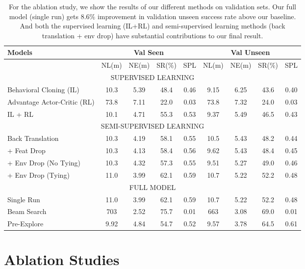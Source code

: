 \documentclass[11pt,a4paper]{article}
\begin{document}
\begin{table*}[t]
\small
\begin{center}

 \begin{tabular}{|l | c c c c | c c c c|}
  \hline
  Models & \multicolumn{4}{c|}{Val Seen} &  \multicolumn{4}{c|}{Val Unseen} \\
  \hline 
   & NL(m) & NE(m)  & SR(\%) & SPL &   NL(m) & NE(m)  & SR(\%) & SPL  \\
\hline\hline
\multicolumn{9}{|c|}{SUPERVISED LEARNING}\\
\hline\hline
Behavioral Cloning (IL) & 10.3&	5.39&	48.4&	0.46&	9.15&	6.25&	43.6&	0.40\\
Advantage Actor-Critic (RL) & 73.8&	7.11&	22.0&	0.03&	73.8&	7.32&	24.0&	0.03\\
IL + RL& 10.1&	4.71&	55.3&	0.53&	9.37&	5.49&	46.5&	0.43 \\
\hline\hline
\multicolumn{9}{|c|}{ SEMI-SUPERVISED LEARNING }\\
\hline\hline
Back Translation & 10.3&	4.19&	58.1&	0.55&	10.5&	5.43&	48.2&	0.44 \\
+ Feat Drop & 10.3&	4.13&	58.4&	0.56& 	9.62&	5.43&	48.4&	0.45\\
+ Env Drop (No Tying)  &10.3&	4.32&	57.3&	0.55&	9.51&	5.27&	49.0&	0.46 \\
+ Env Drop (Tying)&  11.0&	3.99&	62.1&	0.59&	10.7&	5.22&	52.2&	0.48 \\ 
\hline\hline
\multicolumn{9}{|c|}{ FULL MODEL }\\
  \hline\hline
 Single Run&  11.0&	3.99&	62.1&	0.59&	10.7&	5.22&	52.2&	0.48\\
  Beam Search  &703 &	2.52 &	75.7 &	0.01&	663&	3.08&	69.0&	0.01 \\
  Pre-Explore  & 9.92 &	4.84 & 54.7 &	0.52&	9.57&	3.78&	64.5&	0.61 \\
  \hline
\end{tabular}
\end{center}
\caption{For the ablation study, we show the results of our different methods on validation sets. 
Our full model (single run) gets $8.6\%$ improvement in validation unseen success rate above our baseline. 
And both the supervised learning (IL+RL) and semi-supervised learning methods (back translation + env drop) have substantial contributions to our final result.
}
\vspace{-5pt}
\label{table:ablation}
\end{table*}


\section{Ablation Studies}
\label{sec:ablations}
\end{document}
